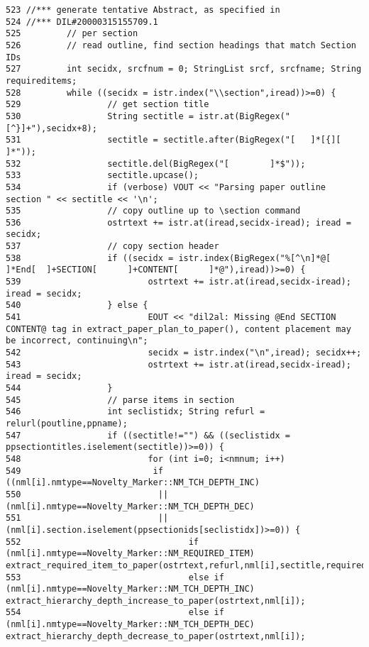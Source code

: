 \begin{verbatim}
523 //*** generate tentative Abstract, as specified in
524 //*** DIL#20000315155709.1
525         // per section
526         // read outline, find section headings that match Section IDs
527         int secidx, srcfnum = 0; StringList srcf, srcfname; String requireditems;
528         while ((secidx = istr.index("\\section",iread))>=0) {
529                 // get section title
530                 String sectitle = istr.at(BigRegex("[^}]+"),secidx+8);
531                 sectitle = sectitle.after(BigRegex("[   ]*[{][  ]*"));
532                 sectitle.del(BigRegex("[        ]*$"));
533                 sectitle.upcase();
534                 if (verbose) VOUT << "Parsing paper outline section " << sectitle << '\n';
535                 // copy outline up to \section command
536                 ostrtext += istr.at(iread,secidx-iread); iread = secidx;
537                 // copy section header
538                 if ((secidx = istr.index(BigRegex("%[^\n]*@[    ]*End[  ]+SECTION[      ]+CONTENT[      ]*@"),iread))>=0) {
539                         ostrtext += istr.at(iread,secidx-iread); iread = secidx;
540                 } else {
541                         EOUT << "dil2al: Missing @End SECTION CONTENT@ tag in extract_paper_plan_to_paper(), content placement may be incorrect, continuing\n";
542                         secidx = istr.index("\n",iread); secidx++;
543                         ostrtext += istr.at(iread,secidx-iread); iread = secidx;
544                 }
545                 // parse items in section
546                 int seclistidx; String refurl = relurl(poutline,ppname);
547                 if ((sectitle!="") && ((seclistidx = ppsectiontitles.iselement(sectitle))>=0)) {
548                         for (int i=0; i<nmnum; i++)
549                          if ((nml[i].nmtype==Novelty_Marker::NM_TCH_DEPTH_INC)
550                           || (nml[i].nmtype==Novelty_Marker::NM_TCH_DEPTH_DEC)
551                           || (nml[i].section.iselement(ppsectionids[seclistidx])>=0)) {
552                                 if (nml[i].nmtype==Novelty_Marker::NM_REQUIRED_ITEM) extract_required_item_to_paper(ostrtext,refurl,nml[i],sectitle,requireditems,pprevtext);
553                                 else if (nml[i].nmtype==Novelty_Marker::NM_TCH_DEPTH_INC) extract_hierarchy_depth_increase_to_paper(ostrtext,nml[i]);
554                                 else if (nml[i].nmtype==Novelty_Marker::NM_TCH_DEPTH_DEC) extract_hierarchy_depth_decrease_to_paper(ostrtext,nml[i]);

\end{verbatim}

